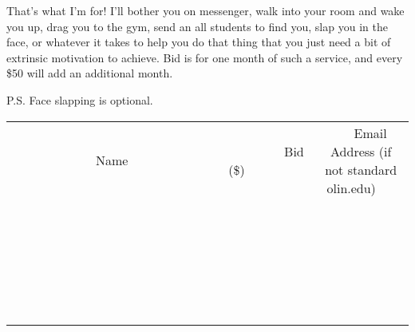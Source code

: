 \documentclass[11pt]{article}
\begin{document}
That's what I'm for! I'll bother you on messenger, walk into your room and wake you up, drag you to the gym, send an all students to find you, slap you in the face, or whatever it takes to help you do that thing that you just need a bit of extrinsic motivation to achieve. Bid is for one month of such a service, and every \$50 will add an additional month.

P.S. Face slapping is optional. \\[6ex]
\begin{tabular}{c c c}
~~~~~~~~~~~~~Name~~~~~~~~~~~~~ & ~~~~~~~~~Bid (\$)~~~~~~~~~ & ~~~Email Address (if not standard olin.edu)~~~ \\
 & & \\
\hline
 & & \\
\hline
 & & \\
\hline
 & & \\
\hline
 & & \\
\hline
 & & \\
\hline
 & & \\
\hline
 & & \\
\hline
 & & \\
\hline
 & & \\
\hline
 & & \\
\hline
 & & \\
\hline
 & & \\
\hline
 & & \\
\hline
 & & \\
\hline
 & & \\
\hline
 & & \\
\hline
 & & \\
\hline
 & & \\
\hline
 & & \\
\hline
 & & \\
\hline
 & & \\
\hline
 & & \\
\hline
 & & \\
\hline
 & & \\
\hline
 & & \\
\hline
\end{tabular}
\clearpage
\end{document}
